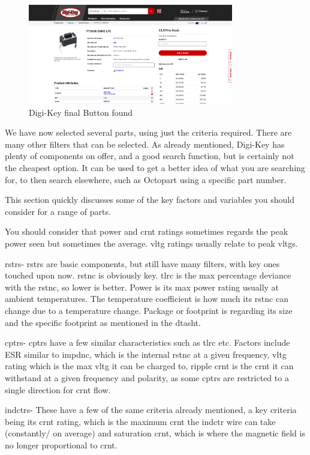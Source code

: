 \documentclass[a4paper,11pt]{report}
\begin{document}
\begin{figure}[H]
\centering
\includegraphics[width=0.8\textwidth]{screenshots/DigiKeyButton}
\caption{Digi-Key final Button found}
\end{figure}

We have now selected several parts, using just the criteria required. There are many other filters that can be selected. As already mentioned, Digi-Key has plenty of components on offer, and a good search function, but is certainly not the cheapest option. It can be used to get a better idea of what you are searching for, to then search elsewhere, such as Octopart using a specific part number.

This section quickly discusses some of the key factors and variables you should consider for a range of parts.

You should consider that power and \gls{crnt} ratings sometimes regards the peak power seen but sometimes the average. \gls{vltg} ratings usually relate to peak \gls{vltg}s.

\gls{rstr}s- \gls{rstr}s are basic components, but still have many filters, with key ones touched upon now. \gls{rstnc} is obviously key. \gls{tlrc} is the max percentage deviance with the \gls{rstnc}, so lower is better. Power is its max power rating usually at ambient temperatures. The temperature coefficient is how much its \gls{rstnc} can change due to a temperature change. Package or footprint is regarding its size and the specific footprint as mentioned in the \gls{dtasht}.

\gls{cptr}s- \gls{cptr}s have a few similar characteristics such as \gls{tlrc} etc. Factors include ESR similar to \gls{impdnc}, which is the internal \gls{rstnc} at a given frequency, \gls{vltg} rating which is the max \gls{vltg} it can be charged to, ripple \gls{crnt} is the \gls{crnt} it can withstand at a given frequency and polarity, as some \gls{cptr}s are restricted to a single direction for \gls{crnt} flow.

\gls{indctr}s- These have a few of the same criteria already mentioned, a key criteria being its \gls{crnt} rating, which is the maximum \gls{crnt} the \gls{indctr} wire can take (constantly/ on average) and saturation \gls{crnt}, which is where the magnetic field is no longer proportional to \gls{crnt}.
\end{document}
